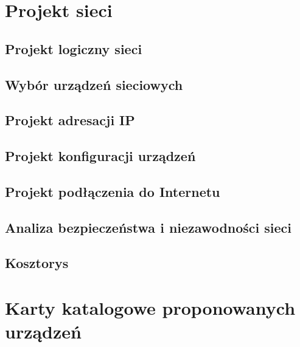 \documentclass{article}
\begin{document}
\newpage
\section{Projekt sieci}

\subsection{Projekt logiczny sieci}

\subsection{Wybór urządzeń sieciowych}

\subsection{Projekt adresacji IP}

\subsection{Projekt konfiguracji urządzeń}

\subsection{Projekt podłączenia do Internetu}

\subsection{Analiza bezpieczeństwa i niezawodności sieci}

\subsection{Kosztorys}

\newpage
\section{Karty katalogowe proponowanych urządzeń}

%
%
%	
%

\end{document}
